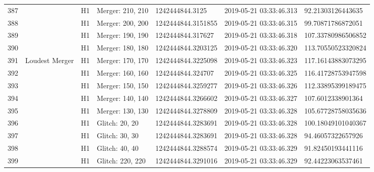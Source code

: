 \begin{longtable}{lllllll}
387  &                                                    &       H1 &  Merger: 210, 210 &     1242444844.3125 &  2019-05-21 03:33:46.313 &   92.21303126443635 \\
388  &                                                    &       H1 &  Merger: 200, 200 &  1242444844.3151855 &  2019-05-21 03:33:46.315 &   99.70871786872051 \\
389  &                                                    &       H1 &  Merger: 190, 190 &   1242444844.317627 &  2019-05-21 03:33:46.318 &  107.33780986506852 \\
390  &                                                    &       H1 &  Merger: 180, 180 &  1242444844.3203125 &  2019-05-21 03:33:46.320 &  113.70550523320824 \\
391  &                                     Loudest Merger &       H1 &  Merger: 170, 170 &  1242444844.3225098 &  2019-05-21 03:33:46.323 &  117.16143883073295 \\
392  &                                                    &       H1 &  Merger: 160, 160 &   1242444844.324707 &  2019-05-21 03:33:46.325 &  116.41728753947598 \\
393  &                                                    &       H1 &  Merger: 150, 150 &  1242444844.3259277 &  2019-05-21 03:33:46.326 &  112.33895399189475 \\
394  &                                                    &       H1 &  Merger: 140, 140 &  1242444844.3266602 &  2019-05-21 03:33:46.327 &   107.6012338901364 \\
395  &                                                    &       H1 &  Merger: 130, 130 &  1242444844.3278809 &  2019-05-21 03:33:46.328 &  105.67728758035636 \\
396  &                                                    &       H1 &    Glitch: 20, 20 &  1242444844.3283691 &  2019-05-21 03:33:46.328 &  100.18049101040367 \\
397  &                                                    &       H1 &    Glitch: 30, 30 &  1242444844.3283691 &  2019-05-21 03:33:46.328 &   94.46057322657926 \\
398  &                                                    &       H1 &    Glitch: 40, 40 &  1242444844.3288574 &  2019-05-21 03:33:46.329 &   91.82450193441116 \\
399  &                                                    &       H1 &  Glitch: 220, 220 &  1242444844.3291016 &  2019-05-21 03:33:46.329 &   92.44223063537461 \\

\end{longtable}
